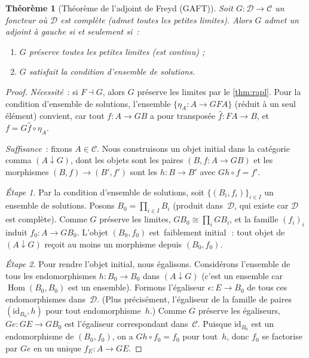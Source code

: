 \documentclass[a4paper,12pt]{book}
\DeclareMathOperator{\Hom}{Hom}
\newcommand{\id}{\mathrm{id}}
\newtheorem{theoreme}{Théorème}[chapter]
\providecommand{\og}{\guillemotleft\,}
\providecommand{\fg}{\,\guillemotright}
\begin{document}
\begin{theoreme}[Théorème de l'adjoint de Freyd (GAFT)]\label{thm:gaft}
Soit $G\colon\mathcal{D}\to\mathcal{C}$ un foncteur où $\mathcal{D}$
est complète (admet toutes les petites limites).
Alors $G$ admet un adjoint à gauche si et seulement si~:
\begin{enumerate}[label=(\roman*)]
\item $G$ préserve toutes les petites limites (est continu) ;
\item $G$ satisfait la condition d'ensemble de solutions.
\end{enumerate}
\end{theoreme}

\begin{proof}
\emph{Nécessité}~: si $F\dashv G$, alors $G$ préserve les limites par
le \autoref{thm:rapl}. Pour la condition d'ensemble de solutions,
l'ensemble $\{\eta_A\colon A\to GFA\}$ (réduit à un seul élément)
convient, car tout $f\colon A\to GB$ a pour transposée $\hat{f}\colon FA\to B$,
et $f = G\hat{f}\circ\eta_A$.

\emph{Suffisance}~: fixons $A\in\mathcal{C}$.
Nous construisons un objet initial dans la catégorie comma $(A\downarrow G)$,
dont les objets sont les paires $(B,f\colon A\to GB)$ et les morphismes
$(B,f)\to(B',f')$ sont les $h\colon B\to B'$ avec $Gh\circ f = f'$.

\emph{Étape 1.} Par la condition d'ensemble de solutions, soit
$\{(B_i,f_i)\}_{i\in I}$ un ensemble de solutions.
Posons $B_0 = \prod_{i\in I}B_i$ (produit dans~$\mathcal{D}$,
qui existe car $\mathcal{D}$ est complète).
Comme $G$ préserve les limites, $GB_0\cong\prod_i GB_i$,
et la famille $(f_i)_i$ induit $f_0\colon A\to GB_0$.
L'objet $(B_0,f_0)$ est \og{}faiblement initial\fg{}~: tout objet
de $(A\downarrow G)$ reçoit au moins un morphisme depuis $(B_0,f_0)$.

\emph{Étape 2.} Pour rendre l'objet initial, nous égalisons.
Considérons l'ensemble de tous les endomorphismes
$h\colon B_0\to B_0$ dans $(A\downarrow G)$
(c'est un ensemble car $\Hom(B_0,B_0)$ est un ensemble).
Formons l'égaliseur $e\colon E\to B_0$ de tous ces endomorphismes
dans~$\mathcal{D}$.
(Plus précisément, l'égaliseur de la famille de paires
$(\id_{B_0}, h)$ pour tout endomorphisme~$h$.)
Comme $G$ préserve les égaliseurs, $Ge\colon GE\to GB_0$ est
l'égaliseur correspondant dans~$\mathcal{C}$.
Puisque $\id_{B_0}$ est un endomorphisme de $(B_0,f_0)$,
on a $Gh\circ f_0 = f_0$ pour tout~$h$, donc
$f_0$ se factorise par $Ge$ en un unique $f_E\colon A\to GE$.


\end{proof}
\end{document}
